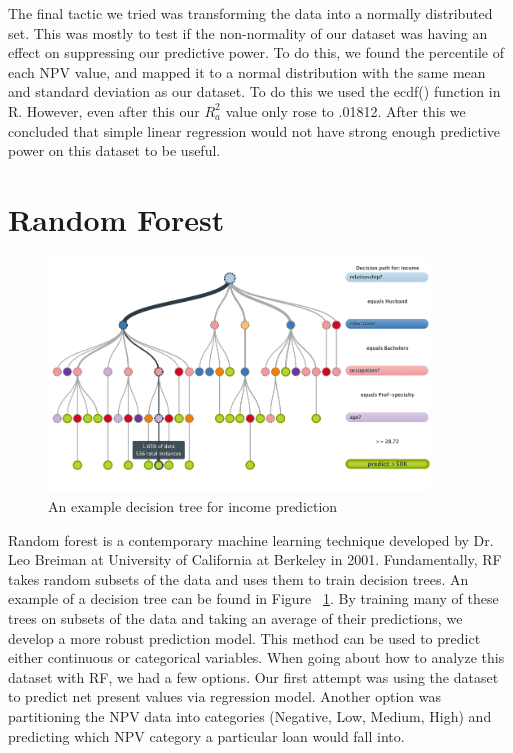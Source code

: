 \documentclass[12 pt]{uncw_thesis}
\theoremstyle{plain}
\theoremstyle{remark}
\theoremstyle{definition}
\begin{document}
The final tactic we tried was transforming the data into a normally distributed set. This was mostly to test if the non-normality of our dataset was having an effect on suppressing our predictive power. To do this, we found the percentile of each NPV value, and mapped it to a normal distribution with the same mean and standard deviation as our dataset. To do this we used the ecdf() function in R. However, even after this our \(R_a^2\) value only rose to .01812. After this we concluded that simple linear regression would not have strong enough predictive power on this dataset to be useful.
\section{Random Forest}
\begin{figure}
	\includegraphics[width=0.9\textwidth]{images/RF.png}
	\caption{An example decision tree for income prediction}
	\label{fig:DecisionTree}
\end{figure}
Random forest is a contemporary machine learning technique developed by Dr. Leo Breiman at University of California at Berkeley in 2001. Fundamentally, RF takes random subsets of the data and uses them to train decision trees. An example of a decision tree can be found in Figure ~\ref{fig:DecisionTree}. By training many of these trees on subsets of the data and taking an average of their predictions, we develop a more robust prediction model. This method can be used to predict either continuous or categorical variables. When going about how to analyze this dataset with RF, we had a few options. Our first attempt was using the dataset to predict net present values via regression model. Another option was partitioning the NPV data into categories (Negative, Low, Medium, High) and predicting which NPV category a particular loan would fall into. 
\end{document}
